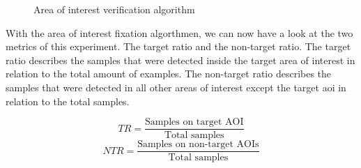 \documentclass[
  12pt,
  letterpaper,
  DIV=11,
  numbers=noendperiod]{scrreprt}
\newenvironment{Shaded}{\begin{snugshade}}{\end{snugshade}}
\newcommand{\CommentTok}[1]{\textcolor[rgb]{0.37,0.37,0.37}{#1}}
\newcommand{\ControlFlowTok}[1]{\textcolor[rgb]{0.00,0.23,0.31}{\textbf{#1}}}
\newcommand{\KeywordTok}[1]{\textcolor[rgb]{0.00,0.23,0.31}{\textbf{#1}}}
\newcommand{\NormalTok}[1]{\textcolor[rgb]{0.00,0.23,0.31}{#1}}
\newcommand{\OperatorTok}[1]{\textcolor[rgb]{0.37,0.37,0.37}{#1}}
\newcommand{\VariableTok}[1]{\textcolor[rgb]{0.07,0.07,0.07}{#1}}
\begin{document}
%

\begin{figure}


\caption{\label{fig-aoi-valid}Area of interest verification algorithm}

\end{figure}%

With the area of interest fixation algorthmen, we can now have a look at
the two metrics of this experiment. The target ratio and the non-target
ratio. The target ratio describes the samples that were detected inside
the target area of interest in relation to the total amount of examples.
The non-target ratio describes the samples that were detected in all
other areas of interest except the target aoi in relation to the total
samples.

\[
TR = \frac{\text{Samples on target AOI}}{\text{Total samples}}
\] \[
NTR = \frac{\text{Samples on non-target AOIs}}{\text{Total samples}}
\]
\end{document}
